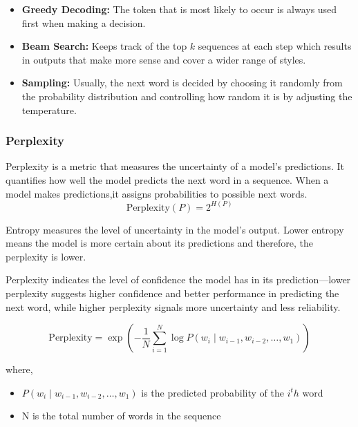 \begin{itemize}
    \item \textbf{Greedy Decoding:} The token that is most likely to occur is always used first when making a decision.
    
    \item \textbf{Beam Search:} Keeps track of the top $k$ sequences at each step which results in outputs that make more sense and cover a wider range of styles.
    
    \item \textbf{Sampling:} Usually, the next word is decided by choosing it randomly from the probability distribution and controlling how random it is by adjusting the temperature.
\end{itemize}

\subsubsection{Perplexity}
Perplexity is a metric that measures the uncertainty of a model's predictions. It quantifies how well the model predicts the next word in a sequence. When a model makes predictions,it assigns probabilities to possible next words.
\begin{equation}
\text{Perplexity}(P) = 2^{H(P)}
\end{equation}

Entropy measures the level of uncertainty in the model's output. Lower entropy means the model is more certain about its predictions and therefore, the perplexity is lower.

Perplexity indicates the level of confidence the model has in its prediction—lower perplexity suggests higher confidence and better performance in predicting the next word, while higher perplexity signals more uncertainty and less reliability.

\begin{equation}
\text{Perplexity} = \exp\left( -\frac{1}{N} \sum_{i=1}^{N} \log P(w_i \mid w_{i-1}, w_{i-2}, \dots, w_1) \right)    
\end{equation}

where,\\
\begin{itemize}
    \item  $P(w_i \mid w_{i-1}, w_{i-2}, \dots, w_1)$ is the predicted probability of the $i^th$ word
    \item N is the total number of words in the sequence
\end{itemize}

